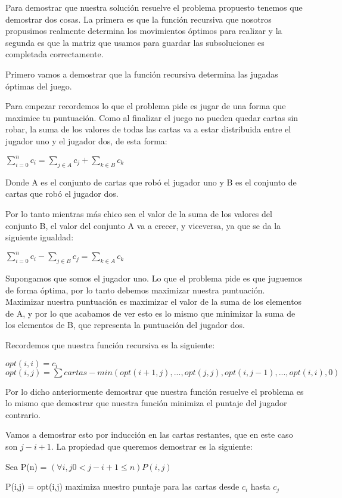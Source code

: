 Para demostrar que nuestra solución resuelve el problema propuesto tenemos que demostrar dos cosas. La primera es que la función recursiva que nosotros propusimos realmente determina los movimientos óptimos para realizar y la segunda es que la matriz que usamos para guardar las subsoluciones es completada correctamente.

Primero vamos a demostrar que la función recursiva determina las jugadas óptimas del juego. 

Para empezar recordemos lo que el problema pide es jugar de una forma que maximice tu puntuación. Como al finalizar el juego no pueden quedar cartas sin robar, la suma de los valores de todas las cartas va a estar distribuida entre el jugador uno y el jugador dos, de esta forma:

$\sum_{i=0}^{n} c_i = \sum_{j \in A} c_j + \sum_{k \in B} c_k$

Donde A es el conjunto de cartas que robó el jugador uno y B es el conjunto de cartas que robó el jugador dos.

Por lo tanto mientras más chico sea el valor de la suma de los valores del conjunto B, el valor del conjunto A va a crecer, y viceversa, ya que se da la siguiente igualdad:

$\sum_{i=0}^{n} c_i  - \sum_{j \in B} c_j= \sum_{k \in A} c_k$

Supongamos que somos el jugador uno. Lo que el problema pide es que juguemos de forma óptima, por lo tanto debemos maximizar nuestra puntuación. Maximizar nuestra puntuación es maximizar el valor de la suma de los elementos de A, y  por lo que acabamos de ver esto es lo mismo que minimizar la suma de los elementos de B, que representa la puntuación del jugador dos.

Recordemos que nuestra función recursiva es la siguiente:

$opt(i,i) = c_i$ \\
$opt(i,j) = \sum cartas - min(opt(i+1, j), ..., opt(j,j), opt(i, j-1), ... ,opt(i,i), 0)$

Por lo dicho anteriormente demostrar que nuestra función resuelve el problema es lo mismo que demostrar que nuestra función minimiza el puntaje del jugador contrario.

Vamos a demostrar esto por inducción en las cartas restantes, que en este caso son $j-i+1$. La propiedad que queremos demostrar es la siguiente:

Sea P(n) = $(\forall i,j 0 < j -i + 1 \leq n) P(i,j)$

P(i,j) = opt(i,j) maximiza nuestro puntaje para las cartas desde $c_i$ hasta $c_j$

